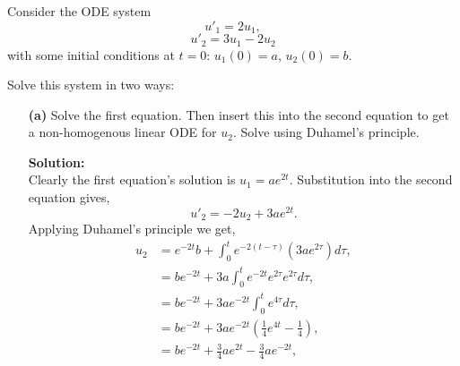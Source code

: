 \documentclass[12pt]{article}
\makeatletter
\theoremstyle{homework}
\newenvironment{exercise}[1]
{\def\@currentlabel{#1}\exercisecore}
{\endexercisecore}
\newcommand{\localhead}[1]{\par\smallskip\noindent\textbf{#1}\nobreak\\}%
\newcommand\solution{\localhead{Solution:}}
\makeatother
\begin{document}
\begin{exercise}{Problem P25} Consider the ODE system
  \begin{equation*}
    u'_1 = 2u_1,
  \end{equation*}
  \begin{equation*}
    u'_2 = 3u_1 - 2u_2
  \end{equation*}
  with some initial conditions at $t = 0$: $u_1(0) = a$, $u_2(0) = b$.
  
  Solve this system in two ways:
  
  \begin{enumerate}
    \item[\textbf{(a)}] Solve the first equation. Then insert this into the second equation to get a 
    non-homogenous linear ODE for $u_2$. Solve using Duhamel's principle. \\
    \solution Clearly the first equation's solution is $u_1 = ae^{2t}$. Substitution into the second 
    equation gives, 
    \begin{equation*}
      u'_2 = -2u_2 + 3ae^{2t}.
    \end{equation*}
    Applying Duhamel's principle we get, 
    \begin{align*}
      u_2 &= e^{-2t}b + \int_{0}^{t} e^{-2(t - \tau)} (3ae^{2\tau}) d\tau,\\
      &= be^{-2t} + 3a\int_{0}^{t}e^{-2t}e^{2\tau}e^{2\tau} d\tau,\\
      &= be^{-2t} + 3ae^{-2t}\int_{0}^{t}e^{4\tau} d\tau,\\
      &= be^{-2t} + 3ae^{-2t}\left(\frac{1}{4}e^{4t} - \frac{1}{4}\right),\\
      &= be^{-2t} + \frac{3}{4}ae^{2t} - \frac{3}{4}ae^{-2t},
    \end{align*}
    \vspace{.15in}



\end{enumerate}
\end{exercise}
\end{document}
